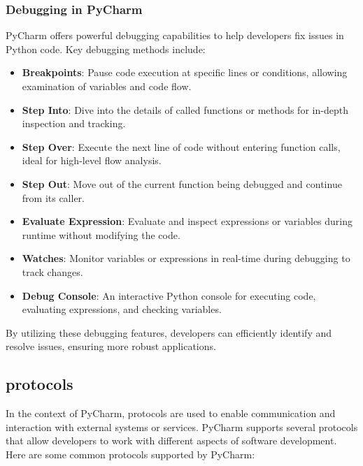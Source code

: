 \subsubsection{Debugging in PyCharm}

PyCharm offers powerful debugging capabilities to help developers fix issues in Python code. Key debugging methods include:

\begin{itemize}
	\item \textbf{Breakpoints}: Pause code execution at specific lines or conditions, allowing examination of variables and code flow.
	\item \textbf{Step Into}: Dive into the details of called functions or methods for in-depth inspection and tracking.
	\item \textbf{Step Over}: Execute the next line of code without entering function calls, ideal for high-level flow analysis.
	\item \textbf{Step Out}: Move out of the current function being debugged and continue from its caller.
	\item \textbf{Evaluate Expression}: Evaluate and inspect expressions or variables during runtime without modifying the code.
	\item \textbf{Watches}: Monitor variables or expressions in real-time during debugging to track changes.
	\item \textbf{Debug Console}: An interactive Python console for executing code, evaluating expressions, and checking variables.
\end{itemize}

By utilizing these debugging features, developers can efficiently identify and resolve issues, ensuring more robust applications.

\subsection{protocols}

In the context of PyCharm, protocols are used to enable communication and interaction with external systems or services. PyCharm supports several protocols that allow developers to work with different aspects of software development. Here are some common protocols supported by PyCharm:

